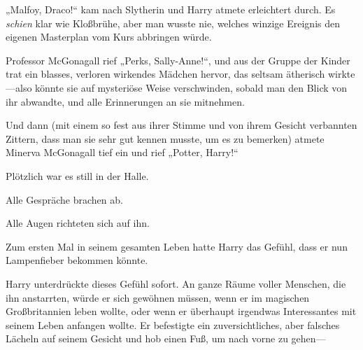 „Malfoy, Draco!“ kam nach Slytherin und Harry atmete erleichtert durch. Es \emph{schien} klar wie Kloßbrühe, aber man wusste nie, welches winzige Ereignis den eigenen Masterplan vom Kurs abbringen würde.

Professor McGonagall rief
„Perks, Sally-Anne!“, und aus der Gruppe der Kinder trat ein blasses, verloren wirkendes Mädchen hervor, das seltsam ätherisch wirkte—also könnte sie auf mysteriöse Weise verschwinden, sobald man den Blick von ihr abwandte, und alle Erinnerungen an sie mitnehmen.

Und dann (mit einem so fest aus ihrer Stimme und von ihrem Gesicht verbannten Zittern, dass man sie sehr gut kennen musste, um es zu bemerken) atmete Minerva McGonagall tief ein und rief
„Potter, Harry!“

Plötzlich war es still in der Halle.

Alle Gespräche brachen ab.

Alle Augen richteten sich auf ihn.

Zum ersten Mal in seinem gesamten Leben hatte Harry das Gefühl, dass er nun Lampenfieber bekommen könnte.


Harry unterdrückte dieses Gefühl sofort. An ganze Räume voller Menschen, die ihn anstarrten, würde er sich gewöhnen müssen, wenn er im magischen Großbritannien leben wollte, oder wenn er überhaupt irgendwas Interessantes mit seinem Leben anfangen wollte. Er befestigte ein zuversichtliches, aber falsches Lächeln auf seinem Gesicht und hob einen Fuß, um nach vorne zu gehen—

